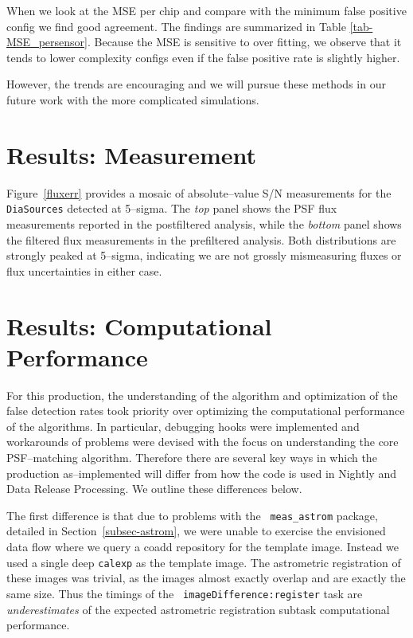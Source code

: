 \documentclass[prd, nofootinbib, floatfix, 11pt,tightenlines,times]{article}
\begin{document}
When we look at the MSE per chip and compare with the minimum false positive config we 
find good agreement.  The findings are summarized in Table \ref{tab-MSE_persensor}.  Because
the MSE is sensitive to over fitting, we observe that it tends to lower complexity configs
even if the false positive rate is slightly higher.

However, the trends are encouraging and we will pursue these methods
in our future work with the more complicated simulations.

\section{Results: Measurement}

Figure~\ref{fluxerr} provides a mosaic of absolute--value S/N
measurements for the {\tt DiaSources} detected at 5--sigma.  The {\it
  top} panel shows the PSF flux measurements reported in the
postfiltered analysis, while the {\it bottom} panel shows the filtered
flux measurements in the prefiltered analysis.  Both distributions are
strongly peaked at 5--sigma, indicating we are not grossly
mismeasuring fluxes or flux uncertainties in either case.

\section{Results: Computational Performance}

For this production, the understanding of the algorithm and
optimization of the false detection rates took priority over
optimizing the computational performance of the algorithms.  In
particular, debugging hooks were implemented and workarounds of
problems were devised with the focus on understanding the core
PSF--matching algorithm.  Therefore there are several key ways in
which the production as--implemented will differ from how the code is
used in Nightly and Data Release Processing.  We outline these
differences below.

The first difference is that due to problems with the {\tt
  meas\_astrom} package, detailed in Section~\ref{subsec-astrom}, we
were unable to exercise the envisioned data flow where we query a
coadd repository for the template image.  Instead we used a single
deep {\tt calexp} as the template image.  The astrometric registration
of these images was trivial, as the images almost exactly overlap and
are exactly the same size.  Thus the timings of the {\tt
  imageDifference:register} task are {\it underestimates} of the
expected astrometric registration subtask computational performance.
\end{document}
